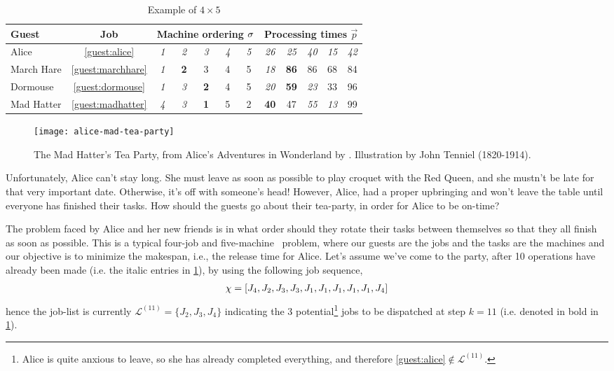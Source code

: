 \begin{table}[t]\centering
\caption{Example of $4\times5$ \JSP}\label{tbl:example}
\begin{tabular}{lc|ccccc|ccccc} \toprule
Guest & \multicolumn{1}{c}{Job} & \multicolumn{5}{c}{Machine ordering 
${\mathbf{\sigma}}$} & \multicolumn{5}{c}{Processing times $\vec{p}$} \\ \midrule
Alice & \ref{guest:alice} & \textit{1} & \textit{2} & \textit{3} & \textit{4} & 
\textit{5} & 
\textit{26} & \textit{25} & \textit{40} & \textit{15} & \textit{42} \\
March Hare & \ref{guest:marchhare} & \textit{1} & \textbf{2} & 3 & 4 & 5 & 
\textit{18} & \textbf{86} & 86 & 68 & 84 \\
Dormouse & \ref{guest:dormouse} & \textit{1} & \textit{3} & \textbf{2} & 4 & 5 
& 
\textit{20} & \textbf{59} & \textit{23} & 33 & 96 \\
Mad Hatter & \ref{guest:madhatter} & \textit{4} & \textit{3} & \textbf{1} & 5 & 
2 & \textbf{40} & 47 & \textit{55} & \textit{13} & 99 
\\
\bottomrule
\end{tabular}
\end{table}

\begin{figure}[b!]\centering 
    \texttt{[image: alice-mad-tea-party]}
    \caption{The Mad Hatter's Tea Party, from Alice's Adventures in Wonderland 
        by \citet{alice}. Illustration by John Tenniel 
        (1820-1914).}\label{fig:teaparty}
\end{figure}

Unfortunately, Alice can't stay long. She must leave as soon as possible to 
play croquet with the Red Queen, 
and she mustn't be late for that very important date. Otherwise, it's off with 
someone's head! However, Alice, had a proper upbringing and won't leave the 
table until everyone has finished their tasks. 
How should the guests go about their tea-party, in order for Alice to be 
on-time?

The problem faced by Alice and her new friends is in what order should they 
rotate their tasks between themselves so that they all finish as soon as 
possible. This is a typical four-job and five-machine \jsp\ problem, where our 
guests are the jobs and the tasks are the machines and our 
objective is to minimize the makespan, i.e., the release time for Alice. 
Let's assume we've come to the party, after 10 operations have already been 
made (i.e. the italic entries in \cref{tbl:example}), by using the following 
job sequence,
\begin{eqnarray}
	{\mathbf{\chi}}=\left[ J_4,J_2,J_3,J_3,J_1,J_1,J_1,J_1,J_1,J_4 \right]
\end{eqnarray}
hence the job-list is currently $\mathcal{L}^{(11)}=\{J_2,J_3,J_4\}$  
indicating the 3 potential\footnote{Alice is quite anxious to leave, so she has 
already completed everything, and therefore 
\ref{guest:alice}$\notin\mathcal{L}^{(11)}$.} jobs to be dispatched at step 
$k=11$ (i.e. denoted in bold in \cref{tbl:example}).
 
